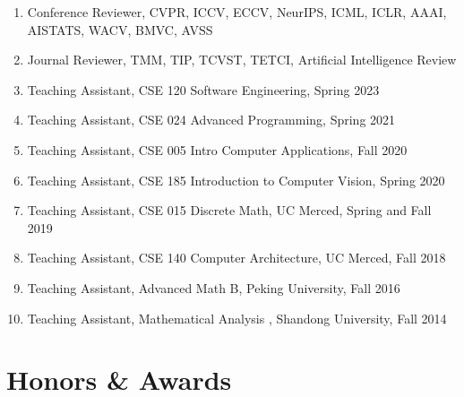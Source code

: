 \documentclass[letterpaper]{article}
\begin{document}
\begin{enumerate}

\item Conference Reviewer, CVPR, ICCV, ECCV, NeurIPS, ICML, ICLR, AAAI, AISTATS, WACV, BMVC, AVSS

\item Journal Reviewer, TMM, TIP, TCVST, TETCI, Artificial Intelligence Review

\item Teaching Assistant, CSE 120 Software Engineering, Spring 2023

\item Teaching Assistant, CSE 024 Advanced Programming, Spring 2021

\item Teaching Assistant, CSE 005 Intro Computer Applications, Fall 2020

\item Teaching Assistant, CSE 185 Introduction to Computer Vision, Spring 2020

\item Teaching Assistant, CSE 015 Discrete Math, UC Merced, Spring and Fall 2019

\item Teaching Assistant, CSE 140 Computer Architecture, UC Merced, Fall 2018

\item Teaching Assistant, Advanced Math B, Peking University, Fall 2016

\item Teaching Assistant, Mathematical Analysis \uppercase\expandafter{}, Shandong University, Fall 2014

\end{enumerate}




\section*{Honors \& Awards}
\end{document}
